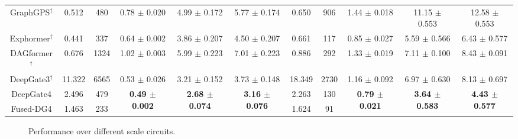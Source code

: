 \begin{table}[H]
{\begin{tabular}{@{}c|ccccc|ccccc@{}}
\midrule
GraphGPS$^\dag$ & 0.512 & \multicolumn{1}{c|}{480} & 0.78 $\pm$ 0.020 & 4.99 $\pm$ 0.172 & 5.77 $\pm$ 0.174 & 0.650 & \multicolumn{1}{c|}{906} & 1.44 $\pm$ 0.018 & 11.15 $\pm$ 0.553 & 12.58 $\pm$ 0.553 \\
Exphormer$^\dag$ & 0.441 & \multicolumn{1}{c|}{337} & 0.64 $\pm$ 0.002 & 3.86 $\pm$ 0.207 & 4.50 $\pm$ 0.207 & 0.661 & \multicolumn{1}{c|}{117} & 0.85 $\pm$ 0.027 & 5.59 $\pm$ 0.566 & 6.43 $\pm$ 0.577 \\
DAGformer$^\dag$ & 0.676 & \multicolumn{1}{c|}{1324} & 1.02 $\pm$ 0.003 & 5.99 $\pm$ 0.223 & 7.01 $\pm$ 0.223 & 0.886 & \multicolumn{1}{c|}{292} & 1.33 $\pm$ 0.019 & 7.11 $\pm$ 0.100 & 8.43 $\pm$ 0.091 \\
DeepGate3$^\dag$ & 11.322 & \multicolumn{1}{c|}{6565} & 0.53 $\pm$ 0.026 & 3.21 $\pm$ 0.152 & 3.73 $\pm$ 0.148 & 18.349 & \multicolumn{1}{c|}{2730} & 1.16 $\pm$ 0.092 & 6.97 $\pm$ 0.630 & 8.13 $\pm$ 0.697 \\ \midrule
DeepGate4 & 2.496 & \multicolumn{1}{c|}{479} & \multirow{2}{*}{\textbf{0.49 $\pm$ 0.002}} & \multirow{2}{*}{\textbf{2.68 $\pm$ 0.074}} & \multirow{2}{*}{\textbf{3.16 $\pm$ 0.076}} & 2.263 & \multicolumn{1}{c|}{130} & \multirow{2}{*}{\textbf{0.79 $\pm$ 0.021}} & \multirow{2}{*}{\textbf{3.64 $\pm$ 0.583}} & \multirow{2}{*}{\textbf{4.43 $\pm$ 0.577}} \\
Fused-DG4 & 1.463 & \multicolumn{1}{c|}{233} &  &  &  & 1.624 & \multicolumn{1}{c|}{91} &  &  &  \\ \bottomrule
\end{tabular}
\label{tab：compare_itc_epfl}
}
\vspace{-15pt}
\end{table}



\vspace{-15pt}
\begin{figure}[H]
\centering
    \vspace{-10pt}
    \caption{Performance over different scale circuits.}
    \vspace{-10pt}
\end{figure}
